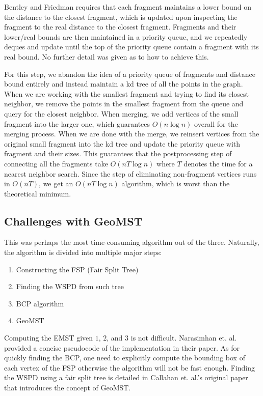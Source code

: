 \documentclass[11pt]{article}
\begin{document}
Bentley and Friedman requires that each fragment maintains a lower bound on the distance to the closest fragment, which is updated upon inspecting the fragment to the real distance to the closest fragment. Fragments and their lower/real bounds are then maintained in a priority queue, and we repeatedly deques and update until the top of the priority queue contain a fragment with its real bound. No further detail was given as to how to achieve this.

For this step, we abandon the idea of a priority queue of fragments and distance bound entirely and instead maintain a kd tree of all the points in the graph. When we are working with the smallest fragment and trying to find its closest neighbor, we remove the points in the smallest fragment from the queue and query for the closest neighbor. When merging, we add vertices of the small fragment into the larger one, which guarantees $O(n\log{n})$ overall for the merging process. When we are done with the merge, we reinsert vertices from the original small fragment into the kd tree and update the priority queue with fragment and their sizes. This guarantees that the postprocessing step of connecting all the fragments take $O(nT\log{n})$ where $T$ denotes the time for a nearest neighbor search. Since the step of eliminating non-fragment vertices runs in $O(nT)$, we get an $O(nT\log{n})$ algorithm, which is worst than the theoretical minimum.

\subsection{Challenges with GeoMST}
This was perhaps the most time-consuming algorithm out of the three. Naturally, the algorithm is divided into multiple major steps:
\begin{enumerate}
	\item Constructing the FSP (Fair Split Tree)
	\item Finding the WSPD from such tree
	\item BCP algorithm
	\item GeoMST
\end{enumerate}

Computing the EMST given $1$, $2$, and $3$ is not difficult. Narasimhan et. al. provided a concise pseudocode of the implementation in their paper.\cite{Narasihman} As for quickly finding the BCP, one need to explicitly compute the bounding box of each vertex of the FSP otherwise the algorithm will not be fast enough. Finding the WSPD using a fair split tree is detailed in Callahan et. al.'s original paper that introduces the concept of GeoMST.\cite{Callahan}
\end{document}
